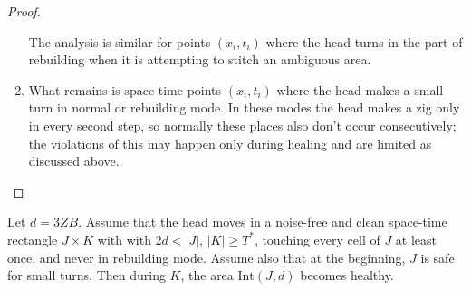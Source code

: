 \documentclass[11pt]{memoir}
\theoremstyle{definition} %
\renewcommand{\ge}{\geq}
\def\B{B}
\newcommand{\Int}{\mathrm{Int}} %
\newcommand{\Tu}{T}
\newcommand{\Z}{Z} %
\begin{document}
\begin{proof}
\begin{enumerate}
  The analysis is similar for points \( (x_{i},t_{i}) \) where the head turns in the part of rebuilding when it is
  attempting to stitch an ambiguous area.

\item What remains is space-time points \( (x_{i},t_{i}) \)
  where the head makes a small turn in normal or rebuilding mode.
  In these modes the head makes a zig only in every second step, so normally these places also don't occur
  consecutively; the violations of this may happen only during healing and are limited as discussed above.
    \end{enumerate}
\end{proof}

\begin{lemma}\label{lem:combined-heals}
 Let \( d = 3\Z\B \).
 Assume that the head moves in a noise-free and clean space-time rectangle
  \( J\times K \) with with \( 2 d < |J| \), \( |K|\ge \Tu^{*} \),
  touching every cell of \( J \) at least once, and never in rebuilding mode.
  Assume also that at the beginning, \( J \) is safe for small turns.
  Then during \( K \), the area \( \Int(J, d) \) becomes healthy.
\end{lemma}
\end{document}
